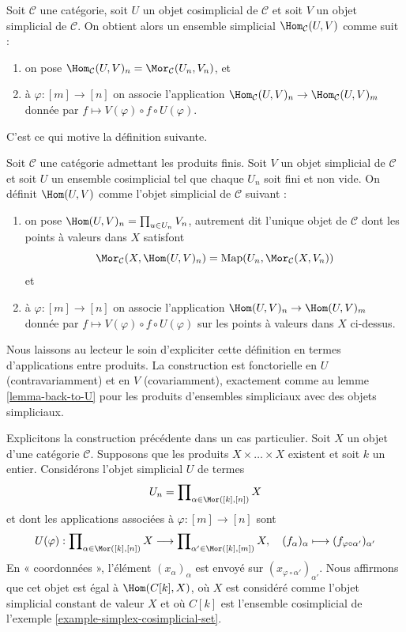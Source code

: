 \noindent
Soit $\mathcal{C}$ une catégorie, soit $U$ un objet cosimplicial de
$\mathcal{C}$ et soit $V$ un objet simplicial de $\mathcal{C}$.
On obtient alors un ensemble simplicial $\Hom_\mathcal{C}(U, V)$
comme suit :
\begin{enumerate}
\item on pose
$\Hom_\mathcal{C}(U, V)_n = \Mor_\mathcal{C}(U_n, V_n)$, et
\item à $\varphi : [m] \to [n]$ on associe l'application
$\Hom_\mathcal{C}(U, V)_n \to \Hom_\mathcal{C}(U, V)_m$
donnée par $f \mapsto V(\varphi) \circ f \circ U(\varphi)$.
\end{enumerate}
C'est ce qui motive la définition suivante.

\begin{definition}
\label{definition-hom-deltak-simplicial}
Soit $\mathcal{C}$ une catégorie admettant les produits finis. Soit $V$
un objet simplicial de $\mathcal{C}$ et soit $U$ un ensemble cosimplicial
tel que chaque $U_n$ soit fini et non vide. On définit
{\it $\Hom(U, V)$} comme l'objet simplicial de $\mathcal{C}$ suivant :
\begin{enumerate}
\item on pose $\Hom(U, V)_n = \prod_{u \in U_n} V_n$, autrement dit
l'unique objet de $\mathcal{C}$ dont les points à valeurs dans $X$
satisfont
$$
\Mor_\mathcal{C}(X, \Hom(U, V)_n)
=
\text{Map}(U_n, \Mor_\mathcal{C}(X, V_n))
$$
et
\item à $\varphi : [m] \to [n]$ on associe l'application
$\Hom(U, V)_n \to \Hom(U, V)_m$
donnée par $f \mapsto V(\varphi) \circ f \circ U(\varphi)$ sur les
points à valeurs dans $X$ ci-dessus.
\end{enumerate}
\end{definition}

\noindent
Nous laissons au lecteur le soin d'expliciter cette définition en termes
d'applications entre produits. La construction est fonctorielle en $U$
(contravariamment) et en $V$ (covariamment), exactement comme au lemme
\ref{lemma-back-to-U} pour les produits d'ensembles simpliciaux avec des
objets simpliciaux.

\medskip\noindent
Explicitons la construction précédente dans un cas particulier. Soit $X$
un objet d'une catégorie $\mathcal{C}$. Supposons que les produits
$X \times \ldots \times X$ existent et soit $k$ un entier. Considérons
l'objet simplicial $U$ de termes
$$
U_n = \prod\nolimits_{\alpha \in \Mor([k], [n])} X
$$
et dont les applications associées à $\varphi : [m] \to [n]$ sont
$$
U(\varphi) :
\prod\nolimits_{\alpha \in \Mor([k], [n])} X
\longrightarrow
\prod\nolimits_{\alpha' \in \Mor([k], [m])} X, \quad
(f_{\alpha})_{\alpha} \longmapsto
(f_{\varphi \circ \alpha'})_{\alpha'}
$$
En « coordonnées », l'élément $(x_\alpha)_\alpha$ est envoyé sur
$(x_{\varphi \circ \alpha'})_{\alpha'}$. Nous affirmons que cet objet
est égal à $\Hom(C[k], X)$, où $X$ est considéré comme l'objet simplicial
constant de valeur $X$ et où $C[k]$ est l'ensemble cosimplicial de
l'exemple \ref{example-simplex-cosimplicial-set}.

